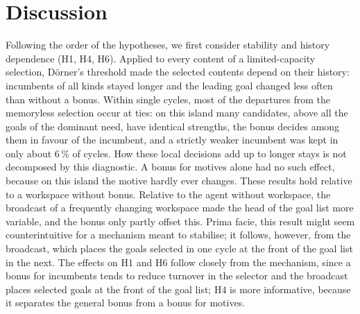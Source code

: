 \documentclass[11pt,a4paper]{article}
\begin{document}
\section{Discussion}

Following the order of the hypotheses, we first consider stability and history dependence (H1, H4, H6). Applied to every content of a limited-capacity selection, D\"orner's threshold made the selected contents depend on their history: incumbents of all kinds stayed longer and the leading goal changed less often than without a bonus. Within single cycles, most of the departures from the memoryless selection occur at ties: on this island many candidates, above all the goals of the dominant need, have identical strengths, the bonus decides among them in favour of the incumbent, and a strictly weaker incumbent was kept in only about 6\,\% of cycles. How these local decisions add up to longer stays is not decomposed by this diagnostic. A bonus for motives alone had no such effect, because on this island the motive hardly ever changes. These results hold relative to a workspace without bonus. Relative to the agent without workspace, the broadcast of a frequently changing workspace made the head of the goal list more variable, and the bonus only partly offset this. Prima facie, this result might seem counterintuitive for a mechanism meant to stabilise; it follows, however, from the broadcast, which places the goals selected in one cycle at the front of the goal list in the next. The effects on H1 and H6 follow closely from the mechanism, since a bonus for incumbents tends to reduce turnover in the selector and the broadcast places selected goals at the front of the goal list; H4 is more informative, because it separates the general bonus from a bonus for motives.
\end{document}
